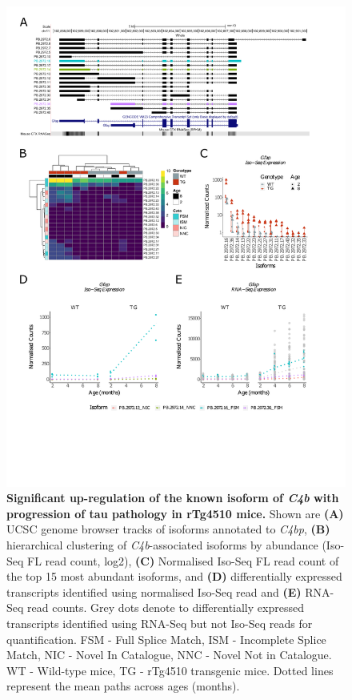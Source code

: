 \begin{figure}[!htp]
	\centering
	\includegraphics[page=2,trim={1.5cm 4.8cm 2cm 1cm}, scale = 0.85]{Figures/Ch5_DiffPlots.pdf}
	\captionsetup{width=0.95\textwidth}
	\caption[Differential \textit{C4b} transcript expression]%
	{\textbf{Significant up-regulation of the known isoform of \textit{C4b} with progression of tau pathology in rTg4510 mice.} Shown are \textbf{(A)} UCSC genome browser tracks of isoforms annotated to \textit{C4bp}, \textbf{(B)} hierarchical clustering of \textit{C4b}-associated isoforms by abundance (Iso-Seq FL read count, log2), \textbf{(C)} Normalised Iso-Seq FL read count of the top 15 most abundant isoforms, and \textbf{(D)} differentially expressed transcripts identified using normalised Iso-Seq read and \textbf{(E)} RNA-Seq read counts. Grey dots denote to differentially expressed transcripts identified using RNA-Seq but not Iso-Seq reads for quantification. FSM - Full Splice Match, ISM - Incomplete Splice Match, NIC - Novel In Catalogue, NNC - Novel Not in Catalogue. WT - Wild-type mice, TG - rTg4510 transgenic mice. Dotted lines represent the mean paths across ages (months).}   
	\label{fig:DEI_c4b}
\end{figure}

